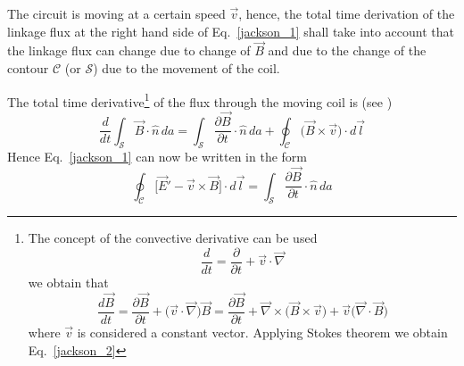 \documentclass[11pt,a4paper,oneside]{book}
\numberwithin{equation}{section}
\theoremstyle{it}
\theoremstyle{definition}
\begin{document}
The circuit is moving at a certain speed $\vec{v}$, hence, the total time 
derivation of the linkage flux at the right hand side of Eq.~\ref{jackson_1} 
shall take into account that the linkage flux can change due to change of 
$\vec{B}$ and due to the change of the contour $\mathcal{C}$ (or $\mathcal{S}$) 
due to the movement of the coil. 


The total time derivative\footnote{
	The concept of the convective derivative can be used \begin{equation*}
		\frac{d}{dt} = \frac{\partial}{\partial t} + \vec{v}\cdot\vec{\nabla}
	\end{equation*}
	we obtain that
	\begin{equation*}
		\frac{d\vec{B}}{dt} = \frac{\partial\vec{B}}{\partial t} + 
		\Big(\vec{v}\cdot\vec{\nabla}\Big)\vec{B} = \frac{\partial 
		\vec{B}}{\partial 
		t}+\vec{\nabla}\times\Big(\vec{B}\times\vec{v}\Big)+\vec{v}\Big(\vec{\nabla}\cdot\vec{B}\Big)
	\end{equation*}
	where $\vec{v}$ is considered a constant vector. Applying Stokes theorem we 
	obtain Eq.~\ref{jackson_2}
} of the flux through the moving coil is (see \cite{p14})
\begin{equation}\label{jackson_2}
	\frac{d}{dt}\int_\mathcal{S}\vec{B}\cdot\hat{n}\,da = 
	\int_\mathcal{S}\frac{\partial\vec{B}}{\partial t}\cdot\hat{n}\,da + 
	\oint_\mathcal{C}\Big(\vec{B}\times\vec{v}\Big)\cdot d\vec{l}
\end{equation}
Hence Eq.~\ref{jackson_1} can now be written in the form
\begin{equation}\label{jackson_3}
	\oint_\mathcal{C}\Big[\vec{E}'-\vec{v}\times\vec{B}\Big]\cdot d\vec{l} = 
	\int_\mathcal{S}\frac{\partial\vec{B}}{\partial t}\cdot\hat{n}\,da
\end{equation}
\end{document}
